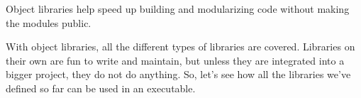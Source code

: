 \begin{tcolorbox}[colback=blue!5!white,colframe=blue!75!black,title=When to Use Object Libraries]
Object libraries help speed up building and modularizing code without making the modules public.
\end{tcolorbox}

With object libraries, all the different types of libraries are covered. Libraries on their own are fun to write and maintain, but unless they are integrated into a bigger project, they do not do anything. So, let's see how all the libraries we've defined so far can be used in an executable.








